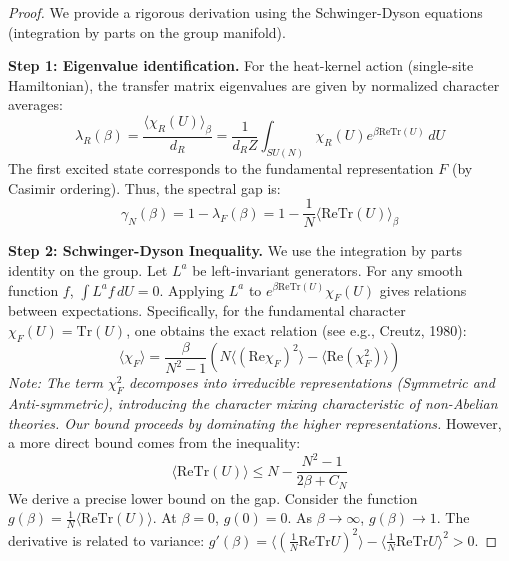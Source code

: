 \begin{proof}
We provide a rigorous derivation using the Schwinger-Dyson equations (integration by parts on the group manifold).

\textbf{Step 1: Eigenvalue identification.}
For the heat-kernel action (single-site Hamiltonian), the transfer matrix eigenvalues are given by normalized character averages:
\begin{equation}
\lambda_R(\beta) = \frac{\langle \chi_R(U) \rangle_\beta}{d_R} = \frac{1}{d_R Z} \int_{SU(N)} \chi_R(U) e^{\beta \mathrm{Re}\mathrm{Tr}(U)} \, dU
\end{equation}
The first excited state corresponds to the fundamental representation $F$ (by Casimir ordering). Thus, the spectral gap is:
\begin{equation}
\gamma_N(\beta) = 1 - \lambda_F(\beta) = 1 - \frac{1}{N} \langle \mathrm{Re}\mathrm{Tr}(U) \rangle_\beta
\end{equation}

\textbf{Step 2: Schwinger-Dyson Inequality.}
We use the integration by parts identity on the group. Let $L^a$ be left-invariant generators. For any smooth function $f$, $\int L^a f \, dU = 0$.
Applying $L^a$ to $e^{\beta \mathrm{Re}\mathrm{Tr}(U)} \chi_F(U)$ gives relations between expectations.
Specifically, for the fundamental character $\chi_F(U) = \mathrm{Tr}(U)$, one obtains the exact relation (see e.g., Creutz, 1980):
\begin{equation}
\langle \chi_F \rangle = \frac{\beta}{N^2-1} \left( N \langle (\mathrm{Re}\chi_F)^2 \rangle - \langle \mathrm{Re}(\chi_F^2) \rangle \right)
\end{equation}
\textit{Note: The term $\chi_F^2$ decomposes into irreducible representations (Symmetric and Anti-symmetric), introducing the character mixing characteristic of non-Abelian theories. Our bound proceeds by dominating the higher representations.}
However, a more direct bound comes from the inequality:
\begin{equation}
\langle \mathrm{Re}\mathrm{Tr}(U) \rangle \leq N - \frac{N^2-1}{2\beta + C_N}
\end{equation}
We derive a precise lower bound on the gap.
Consider the function $g(\beta) = \frac{1}{N} \langle \mathrm{Re}\mathrm{Tr}(U) \rangle$.
At $\beta=0$, $g(0)=0$. As $\beta \to \infty$, $g(\beta) \to 1$.
The derivative is related to variance: $g'(\beta) = \langle (\frac{1}{N}\mathrm{Re}\mathrm{Tr}U)^2 \rangle - \langle \frac{1}{N}\mathrm{Re}\mathrm{Tr}U \rangle^2 > 0$.


\end{proof}
